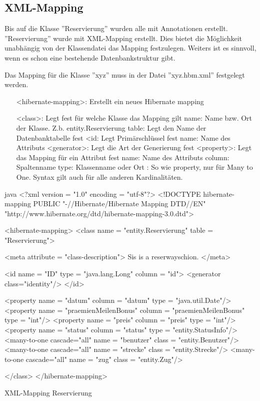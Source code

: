 	\clearpage

	\subsection{XML-Mapping}
	
	Bis auf die Klasse ''Reservierung'' wurden alle mit Annotationen erstellt. ''Reservierung'' wurde mit XML-Mapping erstellt. Dies bietet die Möglichkeit unabhängig von der Klassendatei das Mapping festzulegen. Weiters ist es sinnvoll, wenn es schon eine bestehende Datenbankstruktur gibt.
	
	Das Mapping für die Klasse ''xyz'' muss in der Datei ''xyz.hbm.xml'' festgelegt werden.
	
	\begin{itemize}
		\item[] <hibernate-mapping>: Erstellt ein neues Hibernate mapping
		\item[] <class>: Legt fest für welche Klasse das Mapping gilt
		\subitem name: Name bzw. Ort der Klasse. Z.b. entity.Reservierung
		\subitem table: Legt den Name der Datenbanktabelle fest
		\subitem <id: Legt Primärschlüssel fest
		\subsubitem name: Name des Attributs
		\subsubitem <generator>: Legt die Art der Generierung fest
		\subitem <property>: Legt das Mapping für ein Attribut fest
		\subsubitem name: Name des Attributs
		\subsubitem column: Spaltenname
		\subsubitem type: Klassenname oder Ort
		\subitem <many-to-one>: So wie property, nur für Many to One. Syntax gilt auch für alle anderen Kardinalitäten.
	\end{itemize}
	
	\begin{listing}
	\begin{code}[]{java}
		<?xml version = "1.0" encoding = "utf-8"?>
		<!DOCTYPE hibernate-mapping PUBLIC
		"-//Hibernate/Hibernate Mapping DTD//EN"
		"http://www.hibernate.org/dtd/hibernate-mapping-3.0.dtd">
		
		<hibernate-mapping>
		<class name = "entity.Reservierung" table = "Reservierung">
		
		<meta attribute = "class-description">
		Sis is a reserwayschion.
		</meta>
		
		<id name = "ID" type = "java.lang.Long" column = "id">
		<generator class="identity"/>
		</id>
		
		<property name = "datum" column = "datum" type = "java.util.Date"/>
		<property name = "praemienMeilenBonus" column = "praemienMeilenBonus" type = "int"/>
		<property name = "preis" column = "preis" type = "int"/>
		<property name = "status" column = "status" type = "entity.StatusInfo"/>
		<many-to-one cascade="all" name = "benutzer" class = "entity.Benutzer"/>
		<many-to-one cascade="all" name = "strecke"  class = "entity.Strecke"/>
		<many-to-one cascade="all" name = "zug" class = "entity.Zug"/>
		
		</class>
		</hibernate-mapping>
	\end{code}
	\caption{XML-Mapping Reservierung}
	\end{listing}
	
